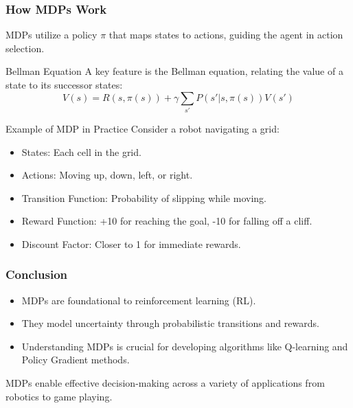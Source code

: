 \documentclass[aspectratio=169]{beamer}
\begin{document}
\begin{frame}[fragile]
  \frametitle{How MDPs Work}
  
  MDPs utilize a policy \( \pi \) that maps states to actions, guiding the agent in action selection.
  
  \begin{block}{Bellman Equation}
    A key feature is the Bellman equation, relating the value of a state to its successor states:
    \begin{equation}
      V(s) = R(s, \pi(s)) + \gamma \sum_{s'} P(s'|s, \pi(s)) V(s')
    \end{equation}
  \end{block}
  
  \begin{block}{Example of MDP in Practice}
    Consider a robot navigating a grid:
    \begin{itemize}
      \item States: Each cell in the grid.
      \item Actions: Moving up, down, left, or right.
      \item Transition Function: Probability of slipping while moving.
      \item Reward Function: +10 for reaching the goal, -10 for falling off a cliff.
      \item Discount Factor: Closer to 1 for immediate rewards.
    \end{itemize}
  \end{block}
\end{frame}

\begin{frame}[fragile]
  \frametitle{Conclusion}
  
  \begin{itemize}
    \item MDPs are foundational to reinforcement learning (RL).
    \item They model uncertainty through probabilistic transitions and rewards.
    \item Understanding MDPs is crucial for developing algorithms like Q-learning and Policy Gradient methods.
  \end{itemize}
  
  MDPs enable effective decision-making across a variety of applications from robotics to game playing.
\end{frame}
\end{document}
